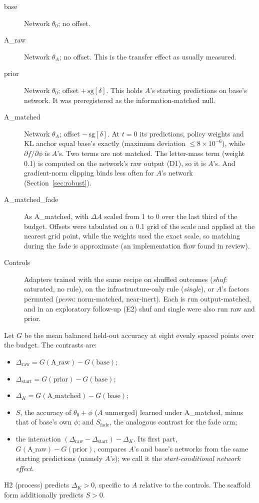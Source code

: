 \documentclass[11pt]{article}
\begin{document}
\begin{description}
\item[base] Network $\theta_0$; no offset.
\item[A\_raw] Network $\theta_A$; no offset. This is the transfer effect as usually measured.
\item[prior] Network $\theta_0$; offset $+\,\mathrm{sg}[\delta]$. This holds $A$'s starting predictions on base's network. It was preregistered as the information-matched null.
\item[A\_matched] Network $\theta_A$; offset $-\,\mathrm{sg}[\delta]$. At $t=0$ its predictions, policy weights and KL anchor equal base's exactly (maximum deviation $\le 8\times10^{-6}$), while $\partial f/\partial\phi$ is $A$'s. Two terms are not matched. The letter-mass term (weight 0.1) is computed on the network's raw output (D1), so it is $A$'s. And gradient-norm clipping binds less often for $A$'s network (Section~\ref{sec:robust}).
\item[A\_matched\_fade] As A\_matched, with $\Delta A$ scaled from 1 to 0 over the last third of the budget. Offsets were tabulated on a 0.1 grid of the scale and applied at the nearest grid point, while the weights used the exact scale, so matching during the fade is approximate (an implementation flaw found in review).
\item[Controls] Adapters trained with the same recipe on shuffled outcomes (\emph{shuf}: saturated, no rule), on the infrastructure-only rule (\emph{single}), or $A$'s factors permuted (\emph{perm}: norm-matched, near-inert). Each is run output-matched, and in an exploratory follow-up (E2) shuf and single were also run raw and prior.
\end{description}

Let $G$ be the mean balanced held-out accuracy at eight evenly spaced points over the budget. The contrasts are:
\begin{itemize}
\item $\Delta_{\text{raw}}=G(\text{A\_raw})-G(\text{base})$;
\item $\Delta_{\text{start}}=G(\text{prior})-G(\text{base})$;
\item $\Delta_K=G(\text{A\_matched})-G(\text{base})$;
\item $S$, the accuracy of $\theta_0+\phi$ ($A$ unmerged) learned under A\_matched, minus that of base's own $\phi$; and $S_{\text{fade}}$, the analogous contrast for the fade arm;
\item the interaction $(\Delta_{\text{raw}}-\Delta_{\text{start}})-\Delta_K$. Its first part, $G(\text{A\_raw})-G(\text{prior})$, compares $A$'s and base's networks from the same starting predictions (namely $A$'s); we call it the \emph{start-conditional network effect}.
\end{itemize}
H2 (process) predicts $\Delta_K>0$, specific to $A$ relative to the controls. The scaffold form additionally predicts $S>0$.
\end{document}
